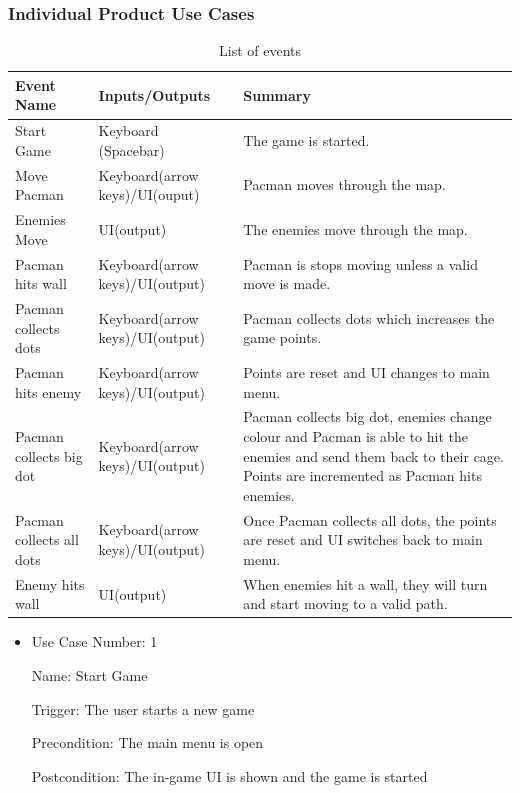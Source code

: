 \documentclass[12pt, titlepage]{article}
\begin{document}
\subsubsection{Individual Product Use Cases}

\begin{table}[H]
\caption{List of events} \label{tab:events}
\begin{tabularx}{\textwidth}{| p{3cm} | p{4cm} | X |}
\toprule {\bf Event Name} & {\bf Inputs/Outputs} & {\bf Summary}\\
\midrule
Start Game & Keyboard (Spacebar) & The game is started.\\ \hline
Move Pacman & Keyboard(arrow keys)/UI(ouput) & Pacman moves through the map.\\ \hline
Enemies Move & UI(output) & The enemies move through the map.\\ \hline
Pacman hits wall & Keyboard(arrow keys)/UI(output) & Pacman is stops moving unless a valid move is made.\\ \hline
Pacman collects dots & Keyboard(arrow keys)/UI(output) & Pacman collects dots which increases the game points.\\ \hline
Pacman hits enemy & Keyboard(arrow keys)/UI(output) & Points are reset and UI changes to main menu.\\ \hline
Pacman collects big dot & Keyboard(arrow keys)/UI(output) & Pacman collects big dot, enemies change colour and Pacman is able to hit the enemies and send them back to their cage. Points are incremented as Pacman hits enemies.\\ \hline
Pacman collects all dots & Keyboard(arrow keys)/UI(output) & Once Pacman collects all dots, the points are reset and UI switches back to main menu.\\ \hline
Enemy hits wall & UI(output) & When enemies hit a wall, they will turn and start moving to a valid path.\\
\bottomrule
\end{tabularx}
\end{table}

\begin{itemize}
\item
Use Case Number: 1

Name: Start Game

Trigger: The user starts a new game

Precondition: The main menu is open

Postcondition: The in-game UI is shown and the game is started

\end{itemize}
\end{document}
